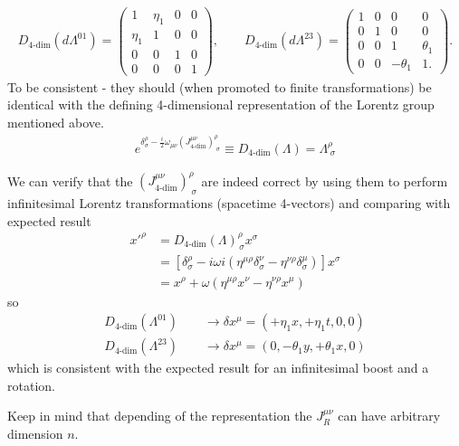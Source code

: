 \documentclass[10pt,a4paper]{report}
\theoremstyle{definition}
\begin{document}
\begin{align}
D_\text{4-dim}(d\Lambda^{01})=\left(
\begin{array}{cccc}
 1  &  \eta_1 &  0 &  0\\
\eta_1  &  1 &  0 &  0\\
 0  &  0 &  1 &  0\\
 0  &  0 &  0 &  1
\end{array}
\right),\qquad
D_\text{4-dim}(d\Lambda^{23})=\left(
\begin{array}{cccc}
1  &  0 &  0 &  0\\
0  &  1 &  0 &  0\\
0  &  0 &  1 &  \theta_1\\
0  &  0 & -\theta_1 &  1.
\end{array}
\right).
\end{align}
To be consistent - they should (when promoted to finite transformations) be identical with the defining 4-dimensional representation of the Lorentz group mentioned above.
\begin{align}
e^{\delta^\rho_\sigma-\frac{i}{2}\omega_{\mu\nu}(J_\text{4-dim}^{\mu\nu})^\rho_{\;\sigma}}\equiv D_\text{4-dim}(\Lambda)=\Lambda^\rho_{\;\sigma}
\end{align}

We can verify that the $(J_\text{4-dim}^{\mu\nu})^\rho_{\;\sigma}$ are indeed correct by using them to perform infinitesimal Lorentz transformations (spacetime 4-vectors) and comparing with expected result
\begin{align}
x'^\rho
&=D_\text{4-dim}(\Lambda)^\rho_{\,\sigma}x^\sigma\\
&=[\delta^\rho_\sigma-i\omega i(\eta^{\mu\rho}\delta^\nu_\sigma-\eta^{\nu\rho}\delta^\mu_\sigma)]x^\sigma\\
&=x^\rho+\omega(\eta^{\mu\rho}x^\nu-\eta^{\nu\rho}x^\mu)
\end{align}
so
\begin{align}
D_\text{4-dim}(\Lambda^{01})\qquad\rightarrow\delta x^\mu=(+\eta_1 x,+\eta_1 t,0,0)\\
D_\text{4-dim}(\Lambda^{23})\qquad\rightarrow\delta x^\mu=(0,-\theta_1 y,+\theta_1 x,0)
\end{align}
which is consistent with the expected result for an infinitesimal boost and a rotation.

Keep in mind that depending of the representation the $J_R^{\mu\nu}$ can have arbitrary dimension $n$. 
\end{document}
